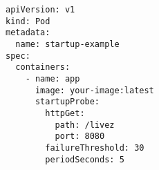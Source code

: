 \begin{verbatim}
apiVersion: v1
kind: Pod
metadata:
  name: startup-example
spec:
  containers:
    - name: app
      image: your-image:latest
      startupProbe:
        httpGet:
          path: /livez
          port: 8080
        failureThreshold: 30
        periodSeconds: 5
\end{verbatim}